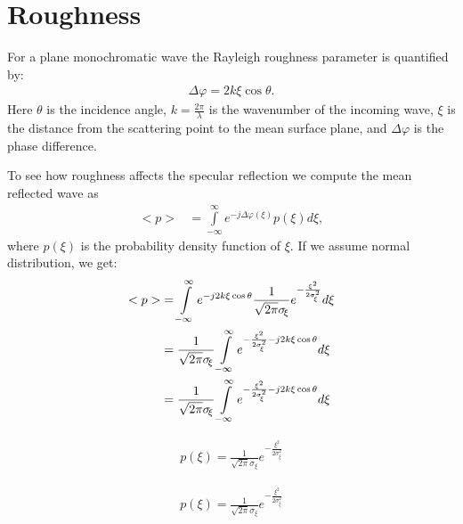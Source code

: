 
\newpage

\section{Roughness}

For a plane monochromatic wave the Rayleigh roughness parameter is quantified by:
\begin{align}
\Delta\varphi = 2k\xi\cos\theta.
\end{align}
Here $\theta$ is the incidence angle, $k = \frac{2\pi}{\lambda}$ is the wavenumber of the incoming wave, $\xi$ is the distance from the scattering point to the mean surface plane, and $\Delta\varphi$ is the phase difference.

\begin{figure}[th]
\end{figure}

To see how roughness affects the specular reflection we compute the mean reflected wave as
\begin{align}
<p> &= \int\limits_{-\infty}^{\infty} e^{-j\Delta\varphi(\xi)} p(\xi) d\xi,
\end{align}
where $p(\xi)$ is the probability density function of $\xi$. If we assume normal distribution, we get:
\begin{align}
<p> &= \int\limits_{-\infty}^{\infty} e^{-j2k\xi\cos\theta} \frac{1}{\sqrt{2\pi}\sigma_{\!\xi}}e^{-\frac{\xi^2}{2\sigma_{\!\xi}^2}} d\xi \nonumber\\
&= \frac{1}{\sqrt{2\pi}\sigma_{\!\xi}} \int\limits_{-\infty}^{\infty} e^{-\frac{\xi^2}{2\sigma_{\!\xi}^2}-j2k\xi\cos\theta} d\xi \nonumber\\
&= \frac{1}{\sqrt{2\pi}\sigma_{\!\xi}} \int\limits_{-\infty}^{\infty} e^{-\frac{\xi^2}{2\sigma_{\!\xi}^2}-j2k\xi\cos\theta} d\xi \nonumber\\
\end{align}


\begin{align}
p(\xi) = \frac{1}{\sqrt{2\pi}\sigma_{\!\xi}}e^{-\frac{\xi^2}{2\sigma_{\!\xi}^2}}
\end{align}


\begin{align}
p(\xi) = \frac{1}{\sqrt{2\pi}\sigma_{\!\xi}}e^{-\frac{\xi^2}{2\sigma_{\!\xi}^2}}
\end{align}

